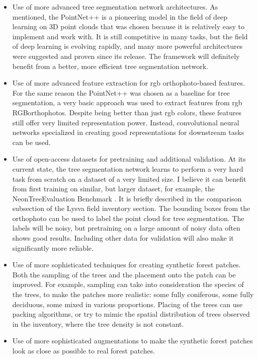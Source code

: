 \begin{itemize}
\item Use of more advanced tree segmentation network architectures.
  As mentioned, the PointNet++ is a pioneering model in the field of deep learning on 3D point clouds that was chosen because it is relatively easy to implement and work with.
  It is still competitive in many tasks, but the field of deep learning is evolving rapidly, and many more powerful architectures were suggested and proven since its release.
  The framework will definitely benefit from a better, more efficient tree segmentation network.
\item Use of more advanced feature extraction for \gls{rgb} orthophoto-based features.
  For the same reason the PointNet++ was chosen as a baseline for tree segmentation, a very basic approach was used to extract features from \gls{rgb} RGBorthophotos.
        Despite being better than just \gls{rgb} colors, these features still offer very limited representation power.
  Instead, convolutional neural networks specialized in creating good representations for downstream tasks can be used.
\item Use of open-access datasets for pretraining and additional validation.
  At its current state, the tree segmentation network learns to perform a very hard task from scratch on a dataset of a very limited size.
  I believe it can benefit from first training on similar, but larger dataset, for example, the NeonTreeEvaluation Benchmark \citep{weinsteinDataNeonTreeEvaluationBenchmark2022}.
  It is briefly described in the comparison subsection of the Lysva field inventory section.
  The bounding boxes from the orthophoto can be used to label the point cloud for tree segmentation.
  The labels will be noisy, but pretraining on a large amount of noisy data often shows good results.
  Including other data for validation will also make it significantly more reliable.
\item Use of more sophisticated techniques for creating synthetic forest patches.
  Both the sampling of the trees and the placement onto the patch can be improved.
  For example, sampling can take into consideration the species of the trees, to make the patches more realistic: some fully coniferous, some fully deciduous, some mixed in various proportions.
  Placing of the trees can use packing algorithms, or try to mimic the spatial distribution of trees observed in the inventory, where the tree density is not constant.
\item Use of more sophisticated augmentations to make the synthetic forest patches look as close as possible to real forest patches.

\end{itemize}
